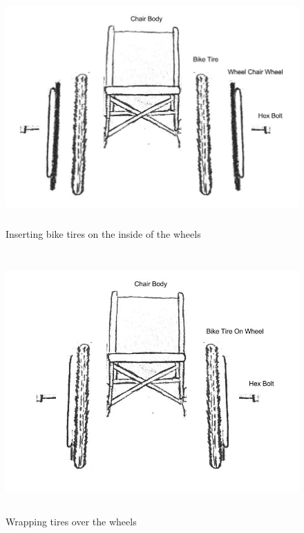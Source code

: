 \documentclass[12pt]{report}
\begin{document}
\begin{figure}[H]
    \centering
    \includegraphics[height=9cm]{tires/insert}
    \caption{Inserting bike tires on the inside of the wheels}
    \label{fig:tires-step4}
\end{figure}

\begin{figure}[H]
    \centering
    \includegraphics[height=10cm]{tires/wrap}
    \caption{Wrapping tires over the wheels}
    \label{fig:tires-step5}
\end{figure}
\end{document}

